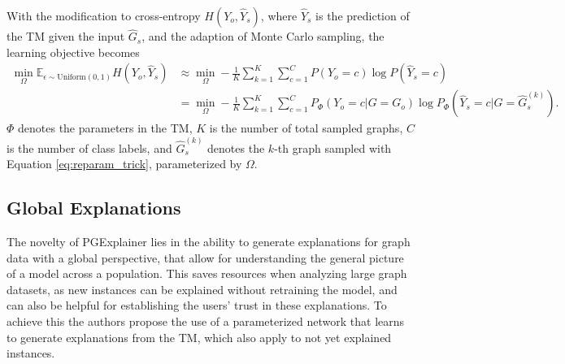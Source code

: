 With the modification to cross-entropy $H(Y_o, \hat{Y}_s)$, where $\hat{Y}_s$ is the prediction of the \ac{TM} given the input $\hat{G}_s$, and the adaption of Monte Carlo sampling, the learning objective becomes
\begin{equation}
    \label{eq:monte_carlo}
    \begin{aligned}
        \min_\Omega\mathbb{E}_{\epsilon\sim\text{Uniform}(0,1)}H(Y_o, \hat{Y}_s) &\approx \min_\Omega -\frac{1}{K}\sum_{k=1}^K\sum_{c=1}^C P(Y_o = c) \log P(\hat{Y}_s = c) \\
        &= \min_\Omega -\frac{1}{K}\sum_{k=1}^K\sum_{c=1}^C P_\Phi (Y_o = c|G = G_o) \log P_\Phi(\hat{Y}_s = c|G=\hat{G}_s^{(k)}).
    \end{aligned}
    \end{equation}
$\Phi$ denotes the parameters in the \ac{TM}, $K$ is the number of total sampled graphs, $C$ is the number of class labels, and $\hat{G}_s^{(k)}$ denotes the $k$-th graph sampled with Equation \ref{eq:reparam_trick}, parameterized by $\Omega$. %





\subsection{Global Explanations}
\label{sec:Global_Explanations}
The novelty of PGExplainer \cite{luo2020parameterized} lies in the ability to generate explanations for graph data with a global perspective, that allow for understanding the general picture of a model across a population. This saves resources when analyzing large graph datasets, as new instances can be explained without retraining the model, and can also be helpful for establishing the users' trust in these explanations. To achieve this the authors propose the use of a parameterized network that learns to generate explanations from the \ac{TM}, which also apply to not yet explained instances. 

